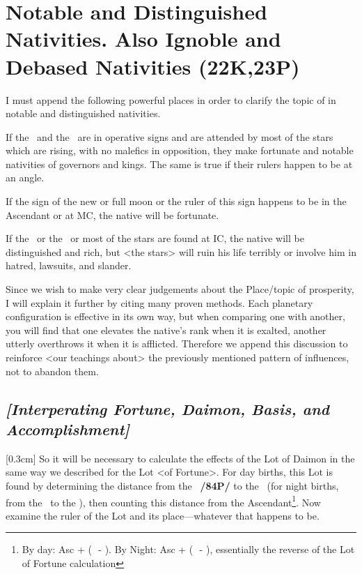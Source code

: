 \section{Notable and Distinguished Nativities. Also Ignoble and Debased Nativities (22K,23P)}

I must append the following powerful places in order to clarify the topic of in notable and distinguished nativities. 

If the \Sun\, and the \Moon\, are in operative signs and are attended by most of the stars which are rising, with no malefics in opposition, they make fortunate and notable nativities of governors and kings. The same is true if their rulers happen to be at an angle. 

If the sign of the new or full moon or the ruler of
this sign happens to be in the Ascendant or at MC, the native will be fortunate. 

If the \Sun\, or the \Moon\, or most of the stars are found at IC, the native will be distinguished and rich, but <the stars> will ruin his life terribly or involve him in hatred, lawsuits, and slander.

Since \mndl we wish to make very clear judgements about the Place/topic of prosperity, I will explain it further by citing many proven methods. Each planetary configuration is effective in its own way, but when comparing one with another, you will find that one elevates the native’s rank when it is exalted, another
utterly overthrows it when it is afflicted. Therefore we append this discussion to reinforce <our teachings about> the previously mentioned pattern of influences, not to abandon them.

\subsection{\textit{[Interperating Fortune, Daimon, Basis, and Accomplishment]}}
[0.3cm]
So it will be necessary to calculate the effects of the Lot of Daimon in the same way we described for the Lot <of Fortune>. For day births, this Lot is found by determining the distance from the \Moon\, \textbf{/84P/} to the \Sun\, (for night births, from the \Sun\, to the \Moon), then counting this distance from the Ascendant\footnote{By day: Asc + (\Sun\,\, - \Moon). By Night: Asc + (\Moon\,\, - \Sun), essentially the reverse of the Lot of Fortune calculation}. Now examine the ruler of the Lot and its place—whatever that happens to be. 

